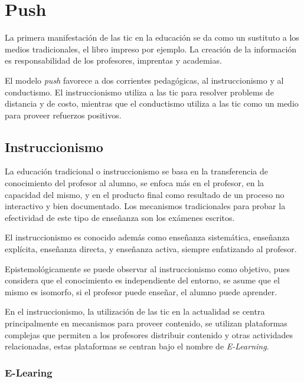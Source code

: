 \section{Push}


La primera manifestación de las \gls{tic} en la educación se da como un
sustituto a los medios tradicionales, el libro impreso por ejemplo. La creación
de la información es responsabilidad de los profesores, imprentas y
academias\cite{leinonen:ict,white:ict}.

El modelo \emph{push} favorece a dos corrientes pedagógicas, al instruccionismo
y al conductismo. El instruccionismo utiliza a las \gls{tic} para resolver
problems de distancia y de
costo\cite{igi:instructionism,johnson2005instructionism}, mientras que el
conductismo utiliza a las \gls{tic} como un medio para proveer refuerzos
positivos\cite{weegar2012comparison}.

\subsection{Instruccionismo}

La educación tradicional o instruccionismo se basa en la transferencia de
conocimiento del profesor al alumno, se enfoca más en el profesor, en la
capacidad del mismo, y en el producto final como resultado de un proceso no
interactivo y bien
documentado\cite{igi:instructionism,johnson2005instructionism}. Los mecanismos
tradicionales para probar la efectividad de este tipo de enseñanza son los
exámenes escritos.

El instruccionismo es conocido además como enseñanza sistemática, enseñanza
explícita, enseñanza directa, y enseñanza activa, siempre enfatizando al
profesor\cite{johnson2005instructionism}.

Epistemológicamente se puede observar al instruccionismo como objetivo, pues
considera que el conocimiento es independiente del entorno, se asume que el
mismo es isomorfo, si el profesor puede enseñar, el alumno puede
aprender\cite{johnson2005instructionism}.

En el instruccionismo, la utilización de las \Gls{tic} en la actualidad se
centra principalmente en mecanismos para proveer contenido, se utilizan
plataformas complejas que permiten a los profesores distribuir contenido y otras
actividades relacionadas, estas plataformas se centran bajo el nombre de
\emph{E-Learning}.




\subsubsection{E-Learing} 

